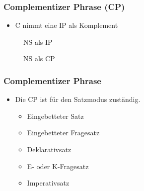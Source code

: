 \begin{frame}
	\frametitle{Complementizer Phrase (CP)}
	
	\begin{itemize}
		\item C nimmt eine IP als Komplement
	\end{itemize}
	
	\begin{minipage}[b]{0.45\textwidth}
		\begin{figure}
			\centering
			\caption{NS als IP}	
		\end{figure}		
	\end{minipage}  
	\pause
	\begin{minipage}[b]{0.45\textwidth}
		\begin{figure}
			\centering
			\caption{NS als CP}	
		\end{figure}		
	\end{minipage}  
	
	\nocite{Fries&MyP16i}
	
\end{frame}


\begin{frame}
	\frametitle{Complementizer Phrase}
	
	\begin{itemize}
		\item Die CP ist für den Satzmodus zuständig.
		\begin{itemize}
			\item Eingebetteter Satz
			\item Eingebetteter Fragesatz
			\item Deklarativsatz
			\item E- oder K-Fragesatz
			\item Imperativsatz
		\end{itemize}
	\end{itemize}
\end{frame}



